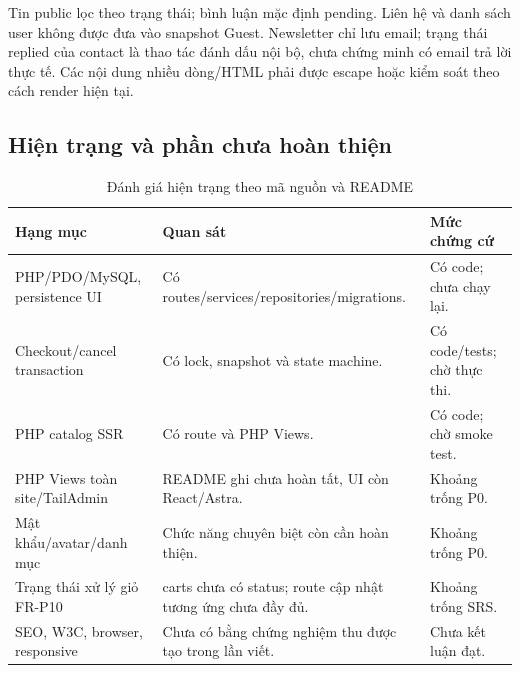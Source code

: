 Tin public lọc theo trạng thái; bình luận mặc định pending. Liên hệ và danh sách user không được đưa vào snapshot Guest. Newsletter chỉ lưu email; trạng thái replied của contact là thao tác đánh dấu nội bộ, chưa chứng minh có email trả lời thực tế. Các nội dung nhiều dòng/HTML phải được escape hoặc kiểm soát theo cách render hiện tại.

\subsection{Hiện trạng và phần chưa hoàn thiện}
\begin{table}[H]\centering
\caption{Đánh giá hiện trạng theo mã nguồn và README}\label{tab:implementation-status}
\begin{tabularx}{\linewidth}{@{}P{4.2cm}YP{3cm}@{}}\toprule
Hạng mục & Quan sát & Mức chứng cứ\\\midrule
PHP/PDO/MySQL, persistence UI & Có routes/services/repositories/migrations. & Có code; chưa chạy lại.\\
Checkout/cancel transaction & Có lock, snapshot và state machine. & Có code/tests; chờ thực thi.\\
PHP catalog SSR & Có route và PHP Views. & Có code; chờ smoke test.\\
PHP Views toàn site/TailAdmin & README ghi chưa hoàn tất, UI còn React/Astra. & Khoảng trống P0.\\
Mật khẩu/avatar/danh mục & Chức năng chuyên biệt còn cần hoàn thiện. & Khoảng trống P0.\\
Trạng thái xử lý giỏ FR-P10 & carts chưa có status; route cập nhật tương ứng chưa đầy đủ. & Khoảng trống SRS.\\
SEO, W3C, browser, responsive & Chưa có bằng chứng nghiệm thu được tạo trong lần viết. & Chưa kết luận đạt.\\
\bottomrule\end{tabularx}
\end{table}
\clearpage
